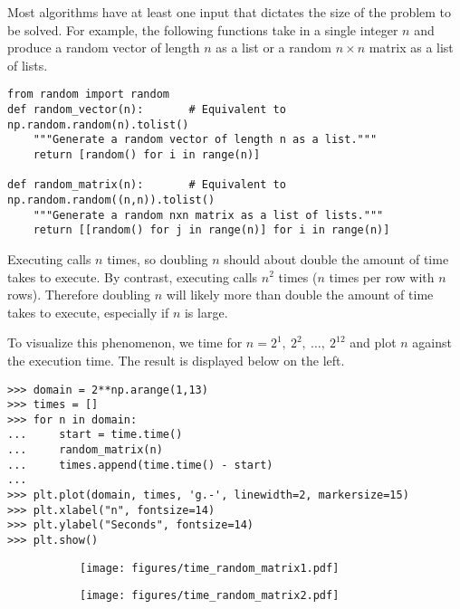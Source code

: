 Most algorithms have at least one input that dictates the size of the problem to be solved.
For example, the following functions take in a single integer $n$ and produce a random vector of length $n$ as a list or a random $n\times n$ matrix as a list of lists.

\begin{lstlisting}
from random import random
def random_vector(n):       # Equivalent to np.random.random(n).tolist()
    """Generate a random vector of length n as a list."""
    return [random() for i in range(n)]

def random_matrix(n):       # Equivalent to np.random.random((n,n)).tolist()
    """Generate a random nxn matrix as a list of lists."""
    return [[random() for j in range(n)] for i in range(n)]
\end{lstlisting}

Executing  calls  $n$ times, so doubling $n$ should about double the amount of time  takes to execute.
By contrast, executing  calls  $n^2$ times ($n$ times per row with $n$ rows).
Therefore doubling $n$ will likely more than double the amount of time  takes to execute, especially if $n$ is large.

To visualize this phenomenon, we time  for $n = 2^1,\ 2^2,\ \ldots,\ 2^{12}$ and plot $n$ against the execution time.
The result is displayed below on the left.

\begin{lstlisting}
>>> domain = 2**np.arange(1,13)
>>> times = []
>>> for n in domain:
...     start = time.time()
...     random_matrix(n)
...     times.append(time.time() - start)
...
>>> plt.plot(domain, times, 'g.-', linewidth=2, markersize=15)
>>> plt.xlabel("n", fontsize=14)
>>> plt.ylabel("Seconds", fontsize=14)
>>> plt.show()
\end{lstlisting}

\begin{figure}[H] %
\captionsetup[subfigure]{justification=centering}
\centering
\begin{subfigure}{.5\textwidth}
    \centering
    \texttt{[image: figures/time\_random\_matrix1.pdf]}
\end{subfigure}%
\begin{subfigure}{.5\textwidth}
    \centering
    \texttt{[image: figures/time\_random\_matrix2.pdf]}
\end{subfigure}
\end{figure}

